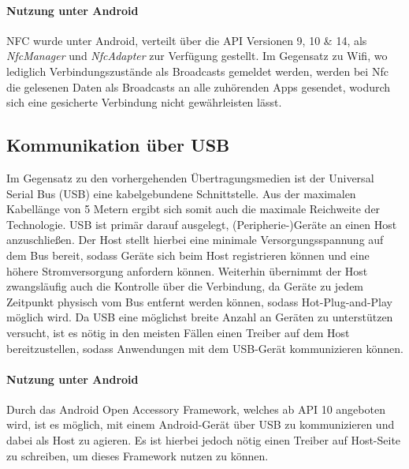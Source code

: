         \paragraph{Nutzung unter Android}
        NFC wurde unter Android, verteilt über die API Versionen 9, 10 \& 14,  als {\it NfcManager} und {\it NfcAdapter} zur Verfügung gestellt. Im Gegensatz zu Wifi, wo lediglich Verbindungszustände als Broadcasts gemeldet werden, werden bei Nfc die gelesenen Daten als Broadcasts an alle zuhörenden Apps gesendet, wodurch sich eine gesicherte Verbindung nicht gewährleisten lässt.

    \subsection{Kommunikation über USB}
        Im Gegensatz zu den vorhergehenden Übertragungsmedien ist der Universal Serial Bus (USB) eine kabelgebundene Schnittstelle. Aus der maximalen Kabellänge von 5 Metern
        ergibt sich somit auch die maximale Reichweite der Technologie. USB ist primär darauf ausgelegt, (Peripherie-)Geräte an einen Host anzuschließen.
        Der Host stellt hierbei eine minimale Versorgungsspannung auf dem Bus bereit, sodass Geräte sich beim Host registrieren können und eine höhere Stromversorgung anfordern können.
        Weiterhin übernimmt der Host zwangsläufig auch die Kontrolle über die Verbindung, da Geräte zu jedem Zeitpunkt physisch vom Bus entfernt werden können, sodass Hot-Plug-and-Play
        möglich wird.\cite[S.21-24]{AI-Kelm}
        Da USB eine möglichst breite Anzahl an Geräten zu unterstützen versucht, ist es nötig in den meisten Fällen einen Treiber auf dem Host bereitzustellen, sodass Anwendungen mit dem USB-Gerät kommunizieren können.\cite[S.197]{AI-Kelm}

        \paragraph{Nutzung unter Android}
        Durch das Android Open Accessory Framework, welches ab API 10 angeboten wird, ist es möglich, mit einem Android-Gerät über USB zu kommunizieren und dabei als Host zu agieren. Es ist hierbei jedoch nötig einen Treiber auf Host-Seite zu schreiben, um dieses Framework nutzen zu können. \cite{AI-AOA}

